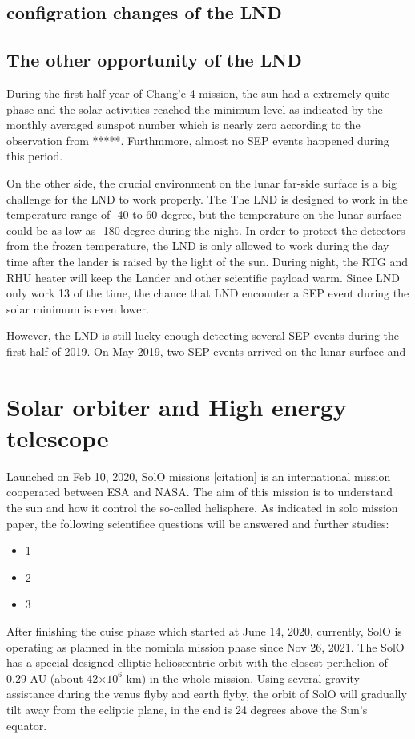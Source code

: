 \subsection{configration changes of the LND}

\subsection{The other opportunity of the LND}


During the first half year of Chang'e-4 mission, the sun had a extremely quite phase and the solar activities reached the minimum level as indicated by the monthly averaged sunspot number which is nearly zero according to the observation from *****. Furthmmore, almost no SEP events happened during this period. 

On the other side, the crucial environment on the lunar far-side surface is a big challenge for the LND to work properly. The
The LND is designed to work in the temperature range of -40 to 60 degree, but the temperature on the lunar surface could be as low as -180 degree during the night.
In order to protect the detectors from the frozen temperature, the LND is only allowed to work during the day time after the lander is raised by the light of the sun.
During night, the RTG and RHU heater will keep the Lander and other scientific payload warm. 
Since LND only work 1\/3 of the time, the chance that LND encounter a SEP event during the solar minimum is even lower.

However, the LND is still lucky enough detecting several SEP events during the first half of 2019. 
On May 2019, two SEP events arrived on the lunar surface and 





\section{Solar orbiter and High energy telescope}

Launched on Feb 10, 2020, \acl{SolO} missions [citation] is an international mission cooperated between \ac{ESA} and \ac{NASA}. The aim of this mission is to understand the sun and how it control the so-called helisphere. As indicated in solo mission paper, the following scientifice questions will be answered and further studies:
\begin{itemize}
	\item 1
	\item 2
	\item 3
\end{itemize}
After finishing the cuise phase which started at June 14, 2020, currently, \ac{SolO} is operating as planned in the nominla mission phase since Nov 26, 2021.
The \ac{SolO} has a special designed elliptic helioscentric orbit with the closest perihelion of 0.29 AU (about 42$\times10^6$ km) in the whole mission. Using several gravity assistance during the venus flyby and earth flyby, the orbit of SolO will gradually tilt away from the ecliptic plane, in the end is 24 degrees above the Sun's equator.

